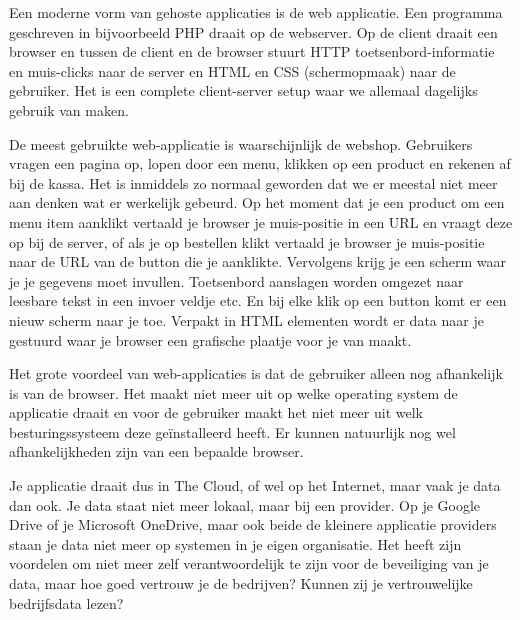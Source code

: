 Een moderne vorm van gehoste applicaties is de web applicatie. Een programma geschreven in bijvoorbeeld PHP draait op de webserver. Op de client draait een browser en tussen de client en de browser stuurt HTTP toetsenbord-informatie  en muis-clicks naar de server en HTML en CSS (schermopmaak) naar de gebruiker. Het is een complete client-server setup waar we allemaal dagelijks gebruik van maken.

De meest gebruikte web-applicatie is waarschijnlijk de webshop. Gebruikers vragen een pagina op, lopen door een menu, klikken op een product en rekenen af bij de kassa. Het is inmiddels zo normaal geworden dat we er meestal niet meer aan denken wat er werkelijk gebeurd. Op het moment dat je een product om een menu item aanklikt vertaald je browser je muis-positie in een URL en vraagt deze op bij de server, of als je op bestellen klikt vertaald je browser je muis-positie naar de URL van de button die je aanklikte. Vervolgens krijg je een scherm waar je je gegevens moet invullen. Toetsenbord aanslagen worden omgezet naar leesbare tekst in een invoer veldje etc. En bij elke klik op een button komt er een nieuw scherm naar je toe. Verpakt in HTML elementen wordt er data naar je gestuurd waar je browser een grafische plaatje voor je van maakt.

Het grote voordeel van web-applicaties is dat de gebruiker alleen nog afhankelijk is van de browser. Het maakt niet meer uit op welke operating system de applicatie draait en voor de gebruiker maakt het niet meer uit welk besturingssysteem deze ge\"installeerd heeft. Er kunnen natuurlijk nog wel afhankelijkheden zijn van een bepaalde browser.

Je applicatie draait dus in The Cloud, of wel op het Internet, maar vaak je data dan ook. Je data staat niet meer lokaal, maar bij een provider. Op je Google Drive of je Microsoft OneDrive, maar ook beide de kleinere applicatie providers staan je data niet meer op systemen in je eigen organisatie. Het heeft zijn voordelen om niet meer zelf verantwoordelijk te zijn voor de beveiliging van je data, maar hoe goed vertrouw je de bedrijven? Kunnen zij je vertrouwelijke bedrijfsdata lezen?
